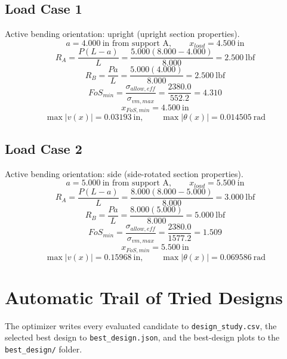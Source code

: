 \documentclass[11pt]{article}
\begin{document}
\subsection*{Load Case 1}
Active bending orientation: upright (upright section properties).
\[a = 4.000\ \mathrm{in} \text{ from support A}, \qquad x_{load} = 4.500\ \mathrm{in}\]
\[R_A = \frac{P(L-a)}{L} = \frac{5.000(8.000-4.000)}{8.000} = 2.500\ \mathrm{lbf}\]
\[R_B = \frac{Pa}{L} = \frac{5.000(4.000)}{8.000} = 2.500\ \mathrm{lbf}\]
\[FoS_{min} = \frac{\sigma_{allow,eff}}{\sigma_{vm,max}} = \frac{2380.0}{552.2} = 4.310\]
\[x_{FoS,min} = 4.500\ \mathrm{in}\]
\[\max |v(x)| = 0.03193\ \mathrm{in}, \qquad \max |\theta(x)| = 0.014505\ \mathrm{rad}\]
\subsection*{Load Case 2}
Active bending orientation: side (side-rotated section properties).
\[a = 5.000\ \mathrm{in} \text{ from support A}, \qquad x_{load} = 5.500\ \mathrm{in}\]
\[R_A = \frac{P(L-a)}{L} = \frac{8.000(8.000-5.000)}{8.000} = 3.000\ \mathrm{lbf}\]
\[R_B = \frac{Pa}{L} = \frac{8.000(5.000)}{8.000} = 5.000\ \mathrm{lbf}\]
\[FoS_{min} = \frac{\sigma_{allow,eff}}{\sigma_{vm,max}} = \frac{2380.0}{1577.2} = 1.509\]
\[x_{FoS,min} = 5.500\ \mathrm{in}\]
\[\max |v(x)| = 0.15968\ \mathrm{in}, \qquad \max |\theta(x)| = 0.069586\ \mathrm{rad}\]

\section*{Automatic Trail of Tried Designs}
The optimizer writes every evaluated candidate to \texttt{design\_study.csv}, the selected best design to \texttt{best\_design.json}, and the best-design plots to the \texttt{best\_design/} folder.
\end{document}
